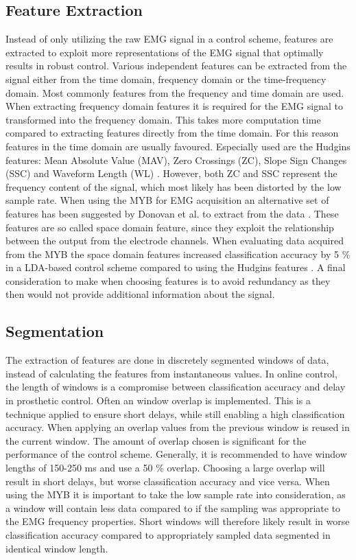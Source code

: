 \subsection{Feature Extraction}
Instead of only utilizing the raw EMG signal in a control scheme, features are extracted to exploit more representations of the EMG signal that optimally results in robust control. Various independent features can be extracted from the signal either from the time domain, frequency domain or the time-frequency domain. Most commonly features from the frequency and time domain are used. When extracting frequency domain features it is required for the EMG signal to transformed into the frequency domain. This takes more computation time compared to extracting features directly from the time domain. For this reason features in the time domain are usually favoured. \cite{Phiny2012} Especially used are the Hudgins features: Mean Absolute Value (MAV), Zero Crossings (ZC), Slope Sign Changes (SSC) and Waveform Length (WL) \cite{Hudgins1993}. However, both ZC and SSC represent the frequency content of the signal, which most likely has been distorted by the low sample rate. When using the MYB for EMG acquisition an alternative set of features has been suggested by Donovan et al. to extract from the data \cite{Donovan2017}. These features are so called space domain feature, since they exploit the relationship between the output from the electrode channels. When evaluating data acquired from the MYB the space domain features increased classification accuracy by 5 \% in a LDA-based control scheme compared to using the Hudgins features \cite{Donovan2017}. A final consideration to make when choosing features is to avoid redundancy as they then would not provide additional information about the signal. 

\subsection{Segmentation}
The extraction of features are done in discretely segmented windows of data, instead of calculating the features from instantaneous values. In online control, the length of windows is a compromise between classification accuracy and delay in prosthetic control. Often an window overlap is implemented. This is a technique applied to ensure short delays, while still enabling a high classification accuracy. When applying an overlap values from the previous window is reused in the current window. The amount of overlap chosen is significant for the performance of the control scheme.  Generally, it is recommended to have window lengths of 150-250 ms and use a 50 $\percent$ overlap. Choosing a large overlap will result in short delays, but worse classification accuracy and vice versa. When using the MYB it is important to take the low sample rate into consideration, as a window will contain less data compared to if the sampling was appropriate to the EMG frequency properties. \cite{Menon2017} Short windows will therefore likely result in worse classification accuracy compared to appropriately sampled data segmented in identical window length.
